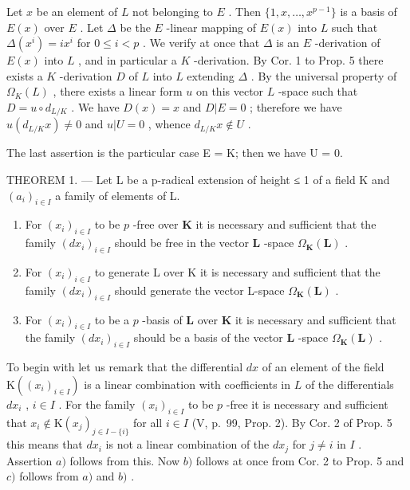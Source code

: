 Let \(x\) be an element of \(L\) not belonging to \(E\) . Then \(\{1, x, \ldots, x^{p-1}\}\) is a basis of \(E(x)\) over \(E\) . Let \(\Delta\) be the \(E\) -linear mapping of \(E(x)\) into \(L\) such that \(\Delta(x^i) = ix^i\) for \(0 \leqslant i < p\) . We verify at once that \(\Delta\) is an \(E\) -derivation of \(E(x)\) into \(L\) , and in particular a \(K\) -derivation. By Cor. 1 to Prop. 5 there exists a \(K\) -derivation \(D\) of \(L\) into \(L\) extending \(\Delta\) . By the universal property of \(\Omega_K(L)\) , there exists a linear form \(u\) on this vector \(L\) -space such that \(D = u \circ d_{L/K}\) . We have \(D(x) = x\) and \(D|E = 0\) ; therefore we have \(u(d_{L/K}x) \neq 0\) and \(u|U = 0\) , whence \(d_{L/K}x \notin U\) .

The last assertion is the particular case E = K; then we have U = 0.

THEOREM 1. --- Let L be a p-radical extension of height ≤ 1 of a field K and \((a_{i})_{i \in I}\) a family of elements of L.

\begin{enumerate}
\def\labelenumi{\alph{enumi})}
\item
  For \((x_{i})_{i\in I}\) to be \(p\) -free over \(\mathbf{K}\) it is necessary and sufficient that the family \((dx_{i})_{i\in I}\) should be free in the vector \(\mathbf{L}\) -space \(\Omega_{\mathbf{K}}(\mathbf{L})\) .
\item
  For \((x_{i})_{i\in I}\) to generate L over K it is necessary and sufficient that the family \((dx_{i})_{i\in I}\) should generate the vector L-space \(\Omega_{\mathbf{K}}(\mathbf{L})\) .
\item
  For \((x_{i})_{i\in I}\) to be a \(p\) -basis of \(\mathbf{L}\) over \(\mathbf{K}\) it is necessary and sufficient that the family \((dx_{i})_{i\in I}\) should be a basis of the vector \(\mathbf{L}\) -space \(\Omega_{\mathbf{K}}(\mathbf{L})\) .
\end{enumerate}

To begin with let us remark that the differential \(dx\) of an element of the field \(\mathrm{K}((x_i)_{i \in I})\) is a linear combination with coefficients in \(L\) of the differentials \(dx_i\) , \(i \in I\) . For the family \((x_i)_{i \in I}\) to be \(p\) -free it is necessary and sufficient that \(x_i \notin \mathrm{K}(x_j)_{j \in I - \{i\}}\) for all \(i \in I\) (V, p.~99, Prop. 2). By Cor. 2 of Prop. 5 this means that \(dx_i\) is not a linear combination of the \(dx_j\) for \(j \neq i\) in \(I\) . Assertion \(a)\) follows from this. Now \(b)\) follows at once from Cor. 2 to Prop. 5 and \(c)\) follows from \(a)\) and \(b)\) .

